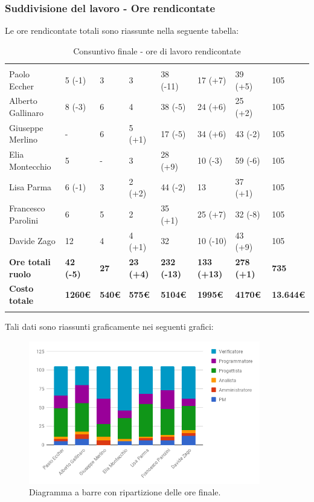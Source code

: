 \subsubsection{Suddivisione del lavoro - Ore rendicontate}
Le ore rendicontate totali sono riassunte nella seguente tabella:

\begin{table}[H]
	\centering
	\begin{tabular}{|C{3.5cm}|C{1cm}|C{1cm}|C{1cm}|C{1cm}|C{1.2cm}|C{1.2cm}|C{1.8cm}|}
		 & & &&&&&\\
		Paolo Eccher      & 5 (-1) & 3 & 3 & 38 (-11) & 17 (+7) & 39 (+5) & 105 \\
		\hline
		Alberto Gallinaro & 8 (-3) & 6 & 4 & 38 (-5) & 24 (+6) & 25 (+2) & 105 \\
		\hline
		Giuseppe Merlino  & - & 6 & 5 (+1) & 17 (-5) & 34 (+6) & 43 (-2) & 105 \\
		\hline
		Elia Montecchio   & 5 & - & 3 & 28 (+9) & 10 (-3) & 59 (-6) & 105 \\
		\hline
		Lisa Parma        & 6 (-1) & 3 & 2 (+2) & 44 (-2) & 13 & 37 (+1) & 105 \\
		\hline
		Francesco Parolini& 6 & 5 & 2 & 35 (+1) & 25 (+7) & 32 (-8) & 105 \\
		\hline
		Davide Zago       & 12 & 4 & 4 (+1) & 32 & 10 (-10) & 43 (+9) & 105 \\
		\hline
		\textbf{Ore totali ruolo}  & \textbf{42 (-5)} & \textbf{27} & \textbf{23 (+4)} & \textbf{232 (-13)} & \textbf{133 (+13)} & \textbf{278 (+1)} & \textbf{735} \\
		\textbf{Costo totale}  & \textbf{1260\euro} & \textbf{540\euro} & \textbf{575\euro} & \textbf{5104\euro} & \textbf{1995\euro} & \textbf{4170\euro} & \textbf{13.644\euro} \\
	\end{tabular}
	\caption{Consuntivo finale - ore di lavoro rendicontate}
\end{table}

Tali dati sono riassunti graficamente nei seguenti grafici:


\begin{figure}[H] 
	\centering 
	\includegraphics[width=0.9\textwidth]{images/BarreFinaleRendicontate.png} 
	\caption{Diagramma a barre con ripartizione delle ore finale.}
	\label{BarreFinaleRendicontate}
\end{figure}

